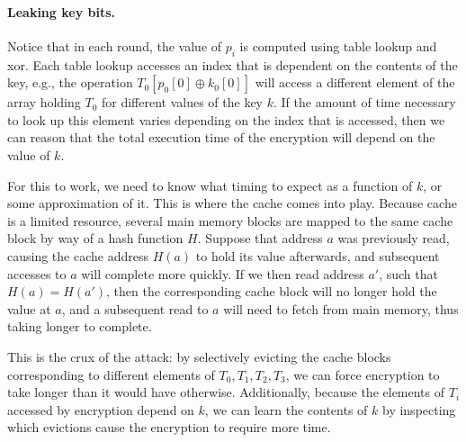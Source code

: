 \documentclass[11pt,twoside]{scrartcl}
\begin{document}
\paragraph{Leaking key bits.} Notice that in each round, the value of $p_i$ is computed using table lookup and xor. Each table lookup accesses an index that is dependent on the contents of the key, e.g., the operation $T_0[p_0[0] \oplus k_0[0]]$ will access a different element of the array holding $T_0$ for different values of the key $k$. If the amount of time necessary to look up this element varies depending on the index that is accessed, then we can reason that the total execution time of the encryption will depend on the value of $k$.

For this to work, we need to know what timing to expect as a function of $k$, or some approximation of it. This is where the cache comes into play. Because cache is a limited resource, several main memory blocks are mapped to the same cache block by way of a hash function $H$. Suppose that address $a$ was previously read, causing the cache address $H(a)$ to hold its value afterwards, and subsequent accesses to $a$ will complete more quickly. If we then read address $a'$, such that $H(a) = H(a')$, then the corresponding cache block will no longer hold the value at $a$, and a subsequent read to $a$ will need to fetch from main memory, thus taking longer to complete.

This is the crux of the attack: by selectively evicting the cache blocks corresponding to different elements of $T_0, T_1, T_2, T_3$, we can force encryption to take longer than it would have otherwise. Additionally, because the elements of $T_i$ accessed by encryption depend on $k$, we can learn the contents of $k$ by inspecting which evictions cause the encryption to require more time.
\end{document}

